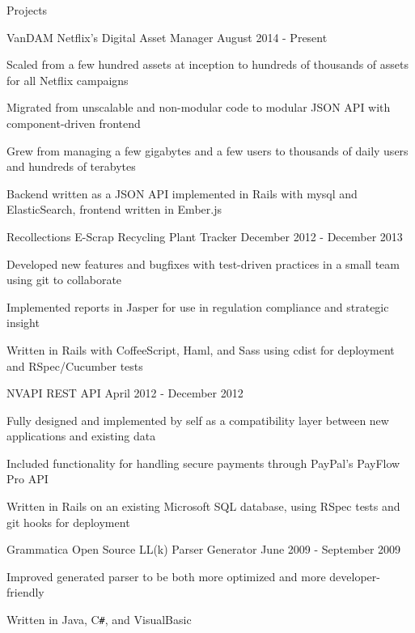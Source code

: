 \documentclass{resume}
\begin{document}
	\begin{section}{Projects}
		\begin{project}{VanDAM}
		               {Netflix's Digital Asset Manager}
			             {August 2014 - Present} %
			\item Scaled from a few hundred assets at inception to hundreds of
			      thousands of assets for all Netflix campaigns
			\item Migrated from unscalable and non-modular code to modular JSON API
			      with component-driven frontend
			\item Grew from managing a few gigabytes and a few users to thousands of
			      daily users and hundreds of terabytes
			\item Backend written as a JSON API implemented in Rails with mysql and
			      ElasticSearch, frontend written in Ember.js
		\end{project}

		\begin{project}{Recollections}
		               {E-Scrap Recycling Plant Tracker}
		               {December 2012 - December 2013} %
			\item Developed new features and bugfixes with test-driven practices in a
			      small team using git to collaborate
			\item Implemented reports in Jasper for use in regulation compliance and
			      strategic insight
			\item Written in Rails with CoffeeScript, Haml, and Sass using cdist for
			      deployment and RSpec/Cucumber tests
		\end{project}

		\begin{project}{NVAPI}
		               {REST API}
		               {April 2012 - December 2012} %
			\item Fully designed and implemented by self as a compatibility layer
			      between new applications and existing data
			\item Included functionality for handling secure payments through
			      PayPal's PayFlow Pro API
			\item Written in Rails on an existing Microsoft SQL database, using RSpec
			      tests and git hooks for deployment
		\end{project}

		\begin{project}{Grammatica}
		               {Open Source LL(k) Parser Generator} %
		               {June 2009 - September 2009} %
			\item Improved generated parser to be both more optimized and more
			      developer-friendly
			\item Written in Java, C\texttt{\#}, and VisualBasic
		\end{project}


\end{section}
\end{document}
